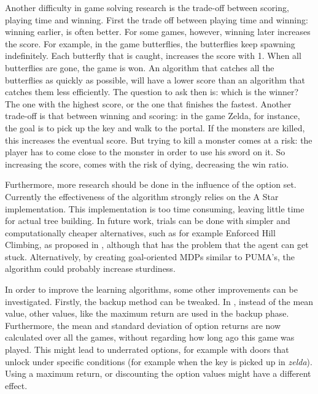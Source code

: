 Another difficulty in game solving research is the trade-off between scoring,
playing time and winning. First the trade off between playing time and winning:
winning earlier, is often better. For some games, however, winning later
increases the score. For example, in the game butterflies, the butterflies keep
spawning indefinitely. Each butterfly that is caught, increases the score with
1. When all butterflies are gone, the game is won. An algorithm that catches all
the butterflies as quickly as possible, will have a lower score than an
algorithm that catches them less efficiently. The question to ask then is: which
is the winner? The one with the highest score, or the one that finishes the
fastest. Another trade-off is that between winning and scoring: in the game
Zelda, for instance, the goal is to pick up the key and walk to the portal. If
the monsters are killed, this increases the eventual score. But trying to kill a
monster comes at a risk: the player has to come close to the monster in order to
use his sword on it. So increasing the score, comes with the risk of dying,
decreasing the win ratio.



Furthermore, more research should be done in the influence of the option set.
Currently the effectiveness of the algorithm strongly relies on the A Star
implementation. This implementation is too time consuming, leaving
little time for actual tree building. In future work, trials can be done with
simpler and computationally cheaper alternatives, such as for example Enforced
Hill Climbing, as proposed in \cite{ross2014general}, although that has the
problem that the agent can get stuck. Alternatively, by creating goal-oriented
MDPs similar to PUMA's, the algorithm could probably increase sturdiness.


In order to improve the learning algorithms, some other improvements can be
investigated. Firstly, the backup method can be tweaked. In
\cite{coulom2007efficient}, instead of the mean value, other values, like the
maximum return are used in the backup phase. Furthermore, the mean and standard
deviation of option returns are now calculated over all the games, without
regarding how long ago this game was played. This might lead to underrated
options, for example with doors that unlock under specific conditions (for
example when the key is picked up in \textit{zelda}).  Using a maximum return,
or discounting the option values might have a different effect.

